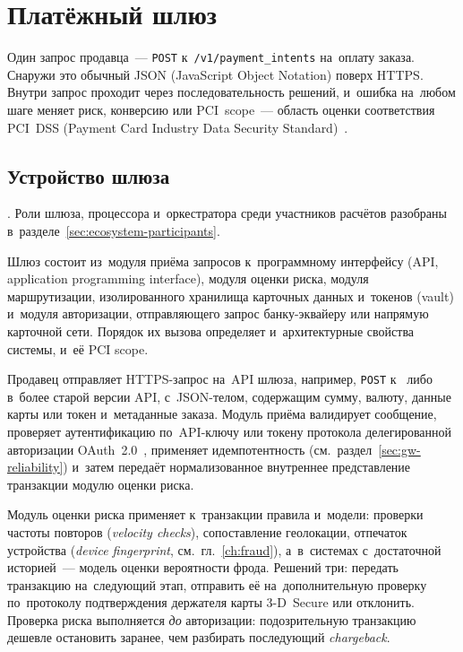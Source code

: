 
\chapter{Платёжный шлюз}\label{ch:gateway}

Один запрос продавца~--- \texttt{POST} к~\texttt{/v1/payment\_intents}
на~оплату заказа. Снаружи это обычный JSON (JavaScript Object Notation) поверх
HTTPS. Внутри запрос проходит через последовательность решений, и~ошибка
на~любом шаге меняет риск, конверсию или PCI~scope~--- область оценки
соответствия PCI~DSS (Payment Card Industry Data Security
Standard)~\cite{pci-dss-4}.

\section{Устройство шлюза}\label{sec:gw-anatomy}

. Роли шлюза, процессора
и~оркестратора среди участников расчётов разобраны
в~разделе~\ref{sec:ecosystem-participants}.

Шлюз состоит из~модуля приёма запросов к~программному интерфейсу (API,
application programming interface), модуля оценки риска, модуля маршрутизации,
изолированного хранилища карточных данных и~токенов (vault) и~модуля
авторизации, отправляющего запрос банку-эквайеру или напрямую карточной сети.
Порядок их вызова определяет и~архитектурные свойства системы, и~её PCI scope.

Продавец отправляет HTTPS-запрос на~API шлюза, например, \texttt{POST}
к~ либо  в~более старой версии
API, с~JSON-телом, содержащим сумму, валюту, данные карты или токен
и~метаданные заказа. Модуль приёма валидирует сообщение, проверяет
аутентификацию по~API-ключу или токену протокола делегированной авторизации
OAuth~2.0~\cite{rfc-6749}, применяет идемпотентность
(см.~раздел~\ref{sec:gw-reliability}) и~затем передаёт нормализованное
внутреннее представление транзакции модулю оценки риска.

Модуль оценки риска применяет к~транзакции правила и~модели: проверки
частоты повторов (\textit{velocity checks}), сопоставление геолокации, отпечаток
устройства (\textit{device fingerprint}, см.~гл.~\ref{ch:fraud}), а~в~системах
с~достаточной историей~--- модель оценки вероятности фрода. Решений
три: передать транзакцию на~следующий этап, отправить её на~дополнительную
проверку по~протоколу подтверждения держателя карты 3-D~Secure или отклонить.
Проверка риска выполняется
\emph{до} авторизации: подозрительную транзакцию дешевле остановить заранее,
чем разбирать последующий \textit{chargeback}.

